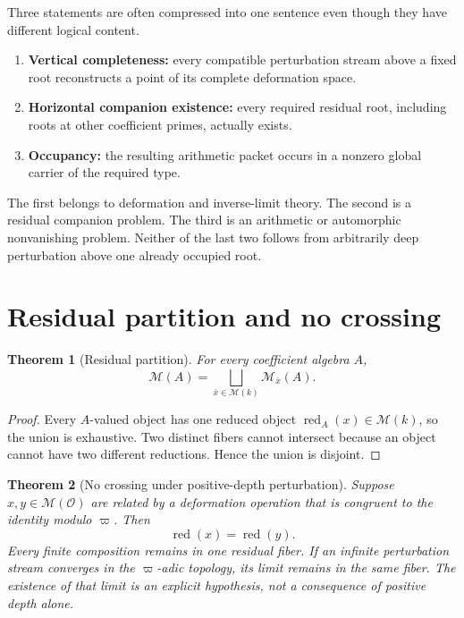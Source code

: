 \documentclass[11pt]{article}
\newtheorem{theorem}{Theorem}[section]
\theoremstyle{definition}
\theoremstyle{remark}
\newcommand{\Ocal}{\mathcal O}
\newcommand{\red}{\operatorname{red}}
\begin{document}
Three statements are often compressed into one sentence even though they have different logical content.

\begin{enumerate}
\item \textbf{Vertical completeness:} every compatible perturbation stream above a fixed root reconstructs a point of its complete deformation space.
\item \textbf{Horizontal companion existence:} every required residual root, including roots at other coefficient primes, actually exists.
\item \textbf{Occupancy:} the resulting arithmetic packet occurs in a nonzero global carrier of the required type.
\end{enumerate}

The first belongs to deformation and inverse-limit theory.  The second is a residual companion problem.  The third is an arithmetic or automorphic nonvanishing problem.  Neither of the last two follows from arbitrarily deep perturbation above one already occupied root.

\section{Residual partition and no crossing}

\begin{theorem}[Residual partition]\label{px:2.1}
For every coefficient algebra \(A\),
\[
\boxed{
\mathcal M(A)
=
\bigsqcup_{\bar x\in\mathcal M(k)}
\mathcal M_{\bar x}(A).
}
\]
\end{theorem}

\begin{proof}
Every \(A\)-valued object has one reduced object \(\red_A(x)\in\mathcal M(k)\), so the union is exhaustive.  Two distinct fibers cannot intersect because an object cannot have two different reductions.  Hence the union is disjoint.
\end{proof}

\begin{theorem}[No crossing under positive-depth perturbation]\label{px:2.2}
Suppose \(x,y\in\mathcal M(\Ocal)\) are related by a deformation operation that is congruent to the identity modulo \(\varpi\).  Then
\[
\red(x)=\red(y).
\]
Every finite composition remains in one residual fiber.  If an infinite perturbation stream converges in the \(\varpi\)-adic topology, its limit remains in the same fiber.  The existence of that limit is an explicit hypothesis, not a consequence of positive depth alone.
\end{theorem}
\end{document}
